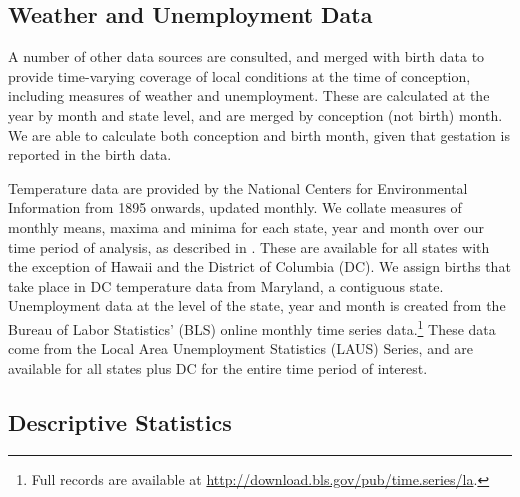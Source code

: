 \documentclass[a4paper, 12 pt]{article}
\theoremstyle{plain}
\begin{document}
\begin{doublespace}




\subsection{Weather and Unemployment Data}
A number of other data sources are consulted, and merged with birth data to provide time-varying coverage of local conditions at the time of conception, including measures of weather and unemployment. These are calculated at the year by month and state level, and are merged by conception (not birth) month.  We are able to calculate both conception and birth month, given that gestation is reported in the birth data.

Temperature data are provided by the National Centers for
Environmental Information from 1895 onwards, updated monthly.  We collate
measures of monthly means, maxima and minima for each state, year and month
over our time period of analysis, as described in \citet{Voseetal2014}. These are
available for all states with the exception of Hawaii and the District of Columbia (DC). We assign births that take place in DC temperature data from Maryland, a contiguous state. Unemployment data at the level of the state, year and month is
created from the Bureau of Labor Statistics' (BLS) online monthly time series
data.\footnote{Full records are available at
\href{http://download.bls.gov/pub/time.series/la}%
{http://download.bls.gov/pub/time.series/la}.} These data come from the Local
Area Unemployment Statistics (LAUS) Series, and are available for all states
plus DC for the entire time period of interest.

\subsection{Descriptive Statistics}


\end{doublespace}
\end{document}
